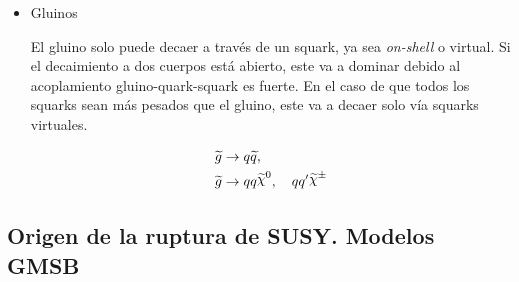 \begin{itemize}
\item Gluinos

  El gluino solo puede decaer a través de un squark, ya sea \emph{on-shell} o virtual. Si
  el decaimiento a dos cuerpos está abierto, este va a dominar debido al
  acoplamiento gluino-quark-squark es fuerte. En el caso de que todos
  los squarks sean más pesados que el gluino, este va a decaer solo vía squarks
  virtuales.

  \begin{align}
    &\gluino \to q\susy{q}, \\
    &\gluino \to qq\nino,\quad qq^\prime \chinopm
  \end{align}

\end{itemize}



\subsection{Origen de la ruptura de SUSY. Modelos GMSB}



